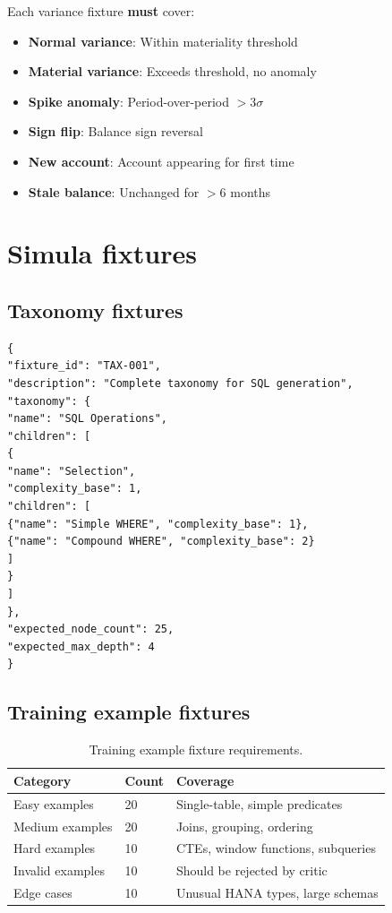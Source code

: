 \documentclass[12pt,a4paper,twoside]{report}
\begin{document}
Each variance fixture \textbf{must} cover:
\begin{itemize}
\item \textbf{Normal variance}: Within materiality threshold
\item \textbf{Material variance}: Exceeds threshold, no anomaly
\item \textbf{Spike anomaly}: Period-over-period $>3\sigma$
\item \textbf{Sign flip}: Balance sign reversal
\item \textbf{New account}: Account appearing for first time
\item \textbf{Stale balance}: Unchanged for $>$6 months
\end{itemize}

\section{Simula fixtures}

\subsection{Taxonomy fixtures}

\begin{lstlisting}[basicstyle=\ttfamily\small,caption={Taxonomy fixture structure.}]
{
"fixture_id": "TAX-001",
"description": "Complete taxonomy for SQL generation",
"taxonomy": {
"name": "SQL Operations",
"children": [
{
"name": "Selection",
"complexity_base": 1,
"children": [
{"name": "Simple WHERE", "complexity_base": 1},
{"name": "Compound WHERE", "complexity_base": 2}
]
}
]
},
"expected_node_count": 25,
"expected_max_depth": 4
}
\end{lstlisting}

\subsection{Training example fixtures}

\begin{table}[htbp]
\centering
\caption{Training example fixture requirements.}
\label{tab:training-fixtures}
\footnotesize
\begin{tabularx}{\linewidth}{@{}l l X@{}}
\toprule
\textbf{Category} & \textbf{Count} & \textbf{Coverage} \\ \midrule
Easy examples & 20 & Single-table, simple predicates \\
Medium examples & 20 & Joins, grouping, ordering \\
Hard examples & 10 & CTEs, window functions, subqueries \\
Invalid examples & 10 & Should be rejected by critic \\
Edge cases & 10 & Unusual HANA types, large schemas \\
\bottomrule
\end{tabularx}
\end{table}
\end{document}
